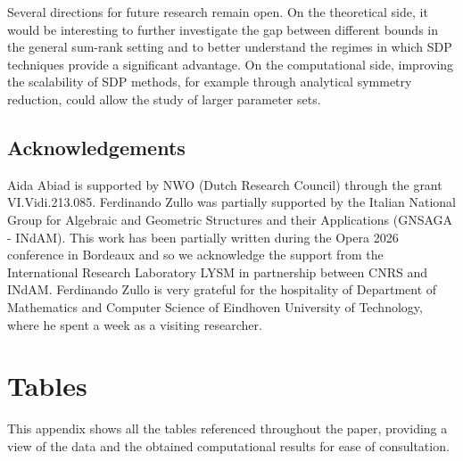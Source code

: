 \documentclass[a4paper]{article}
\begin{document}
Several directions for future research remain open. On the theoretical side, it would be interesting to further investigate the gap between different bounds in the general sum-rank setting and to better understand the regimes in which SDP techniques provide a significant advantage. On the computational side, improving the scalability of SDP methods, for example through analytical symmetry reduction, could allow the study of larger parameter sets. 

\subsection*{Acknowledgements} 

Aida Abiad is supported by NWO (Dutch Research Council) through the grant VI.Vidi.213.085. 
Ferdinando Zullo was partially supported by the Italian National Group for Algebraic and Geometric Structures and their Applications (GNSAGA - INdAM).
This work has been partially written during the Opera 2026 conference in Bordeaux and so we acknowledge the support from the International Research Laboratory LYSM in partnership between CNRS and INdAM. Ferdinando Zullo is very grateful for the hospitality of Department of Mathematics and Computer Science of
Eindhoven University of Technology, where he spent a week as a visiting researcher.





\newpage
\appendix
\section{Tables}
This appendix shows all the tables referenced throughout the paper, providing a view of the data and the obtained computational results for ease of consultation.
\end{document}
